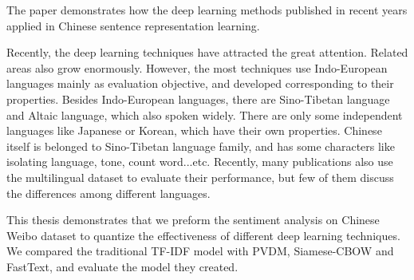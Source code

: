 \begin{abstractEN}

The paper demonstrates how the deep learning methods published in recent years applied in Chinese sentence representation learning.

Recently, the deep learning techniques have attracted the great attention. Related areas also grow enormously. 
However, the most techniques use Indo-European languages mainly as evaluation objective, and developed corresponding to their properties.  
Besides Indo-European languages, there are Sino-Tibetan language and Altaic language, which also spoken widely. 
There are only some independent languages like Japanese or Korean, which have their own properties.
Chinese itself is belonged to Sino-Tibetan language family, and has some characters like isolating language, tone, count word...etc.
Recently, many publications also use the multilingual dataset to evaluate their performance, but few of them discuss the differences among different languages. 

This thesis demonstrates that we preform the sentiment analysis on Chinese Weibo dataset to quantize the effectiveness of different deep learning techniques.
We compared the traditional TF-IDF model with PVDM, Siamese-CBOW and FastText, and evaluate the model they created.

\end{abstractEN}

